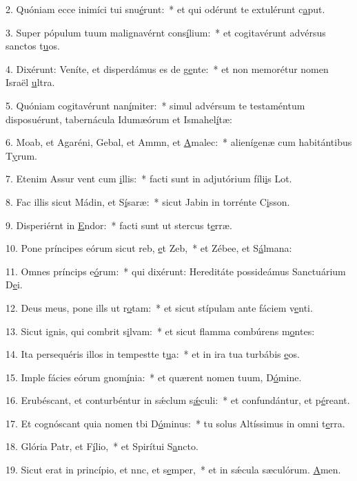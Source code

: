 2. Quóniam ecce inimíci tui snu\uline{é}runt:~* et qui odérunt te extulérunt c\uline{a}put.\par 
3. Super pópulum tuum malignavérnt cons\uline{í}lium:~* et cogitavérunt advérsus sanctos t\uline{u}os.\par 
4. Dixérunt: Veníte, et disperdámus es de g\uline{e}nte:~* et non memorétur nomen Israël \uline{u}ltra.\par 
5. Quóniam cogitavérunt nan\uline{í}miter:~* simul advérsum te testaméntum disposuérunt, tabernácula Idumæórum et Ismahel\uline{í}tæ:\par 
6. Moab, et Agaréni, Gebal, et Ammn, et \uline{A}malec:~* alienígenæ cum habitántibus T\uline{y}rum.\par 
7. Etenim Assur vent cum \uline{i}llis:~* facti sunt in adjutórium fíli\uline{i}s Lot.\par 
8. Fac illis sicut Mádin, et S\uline{í}saræ:~* sicut Jabin in torrénte C\uline{i}sson.\par 
9. Disperiérnt in \uline{E}ndor:~* facti sunt ut stercus t\uline{e}rræ.\par 
10. Pone príncipes eórum sicut reb, \uline{e}t Zeb,~* et Zébee, et S\uline{á}lmana:\par 
11. Omnes príncips e\uline{ó}rum:~* qui dixérunt: Hereditáte possideámus Sanctuárium D\uline{e}i.\par 
12. Deus meus, pone ills ut r\uline{o}tam:~* et sicut stípulam ante fáciem v\uline{e}nti.\par 
13. Sicut ignis, qui combrit s\uline{i}lvam:~* et sicut flamma combúrens m\uline{o}ntes:\par 
14. Ita persequéris illos in tempestte t\uline{u}a:~* et in ira tua turbábis \uline{e}os.\par 
15. Imple fácies eórum gnom\uline{í}nia:~* et quærent nomen tuum, D\uline{ó}mine.\par 
16. Erubéscant, et conturbéntur in sǽclum s\uline{ǽ}culi:~* et confundántur, et p\uline{é}reant.\par 
17. Et cognóscant quia nomen tbi D\uline{ó}minus:~* tu solus Altíssimus in omni t\uline{e}rra.\par 
18. Glória Patr, et F\uline{í}lio,~* et Spirítui S\uline{a}ncto.\par 
19. Sicut erat in princípio, et nnc, et s\uline{e}mper,~* et in sǽcula sæculórum. \uline{A}men.\par 
